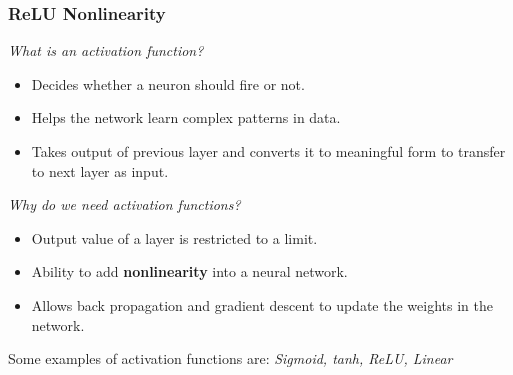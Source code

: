 \documentclass[aspectratio=169, 10pt]{beamer}
\begin{document}
\begin{frame}
	\frametitle{ReLU Nonlinearity}
	\vspace{5pt}
	\emph{What is an activation function?}
	\vspace{8pt}
	
	\begin{itemize}
		\item Decides whether a neuron should fire or not.
		\item Helps the network learn complex patterns in data.
		\item Takes output of previous layer and converts it to meaningful form to transfer to next layer as input.
	\end{itemize}
	
	\vspace{8pt}
	
	\emph{Why do we need activation functions?}
	\vspace{8pt}
	
	\begin{itemize}
		\item Output value of a layer is restricted to a limit.
		\item Ability to add \textbf{nonlinearity} into a neural network.
		\item Allows back propagation and gradient descent to update the weights in the network.
	\end{itemize}
	
	\vspace{5pt}
	Some examples of activation functions are: \textit{Sigmoid, tanh, ReLU, Linear}
\end{frame}
\end{document}
